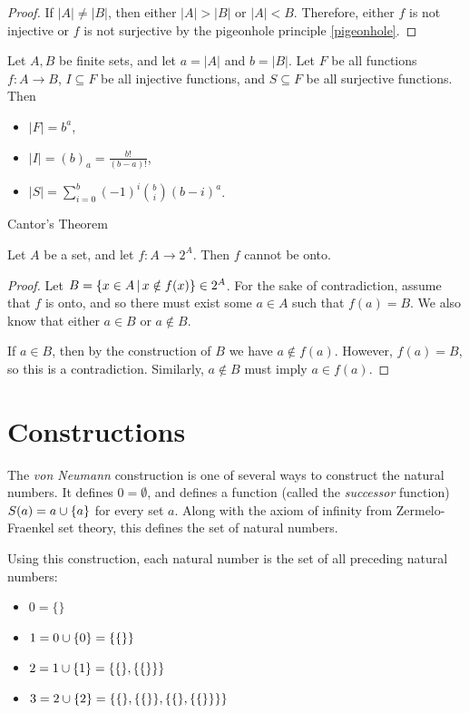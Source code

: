 \begin{proof}
    If $|A| \neq |B|$, then either $|A| > |B|$ or $|A| < B$. Therefore, either $f$ is not injective or $f$ is not surjective by the pigeonhole principle \ref{pigeonhole}.
\end{proof}

\begin{prop}
    Let $A, B$ be finite sets, and let $a = |A|$ and $b = |B|$. Let $F$ be all functions $f: A \to B$, $I \subseteq F$ be all injective functions, and $S \subseteq F$ be all surjective functions. Then
    \begin{itemize}
        \item $|F| = b^a$,
        \item $|I| = (b)_a = \frac{b!}{(b-a)!}$,
        \item $|S| = \sum_{i=0}^b(-1)^i\binom{b}{i}(b-i)^a$.
    \end{itemize}
\end{prop}

\begin{thm}
    Cantor's Theorem

    Let $A$ be a set, and let $f: A \to 2^A$. Then $f$ cannot be onto.
\end{thm}

\begin{proof}
    Let $B = \left\{x \in A \,\middle|\, x \notin f(x) \right\} \in 2^A$. For the sake of contradiction, assume that $f$ is onto, and so there must exist some $a \in A$ such that $f(a) = B$. We also know that either $a \in B$ or $a \notin B$.

    If $a \in B$, then by the construction of $B$ we have $a \notin f(a)$. However, $f(a) = B$, so this is a contradiction. Similarly, $a \notin B$ must imply $a \in f(a)$.
\end{proof}

\section{Constructions}

The \emph{von Neumann} construction is one of several ways to construct the natural numbers. It defines $0 = \emptyset$, and defines a function (called the \emph{successor} function) $S(a) = a \cup \{a\}$ for every set $a$. Along with the axiom of infinity from Zermelo-Fraenkel set theory, this defines the set of natural numbers.

Using this construction, each natural number is the set of all preceding natural numbers:
\begin{itemize}
    \item $0 = \{\}$
    \item $1 = 0 \cup \{0\} = \{\{\}\}$
    \item $2 = 1 \cup \{1\} = \{\{\}, \{\{\}\}\}$
    \item $3 = 2 \cup \{2\} = \{\{\}, \{\{\}\}, \{\{\}, \{\{\}\}\}\}$
\end{itemize}

